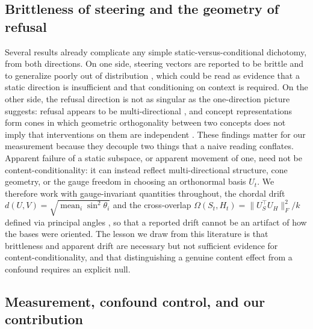 \subsection{Brittleness of steering and the geometry of refusal}

Several results already complicate any simple static-versus-conditional dichotomy, from both directions. On one side, steering vectors are reported to be brittle and to generalize poorly out of distribution \citep{tan2024steering}, which could be read as evidence that a static direction is insufficient and that conditioning on context is required. On the other side, the refusal direction is not as singular as the one-direction picture suggests: refusal appears to be multi-directional \citep{pan2025hidden}, and concept representations form cones in which geometric orthogonality between two concepts does not imply that interventions on them are independent \citep{wollschlager2025geometry}. These findings matter for our measurement because they decouple two things that a naive reading conflates. Apparent failure of a static subspace, or apparent movement of one, need not be content-conditionality: it can instead reflect multi-directional structure, cone geometry, or the gauge freedom in choosing an orthonormal basis $U_t$. We therefore work with gauge-invariant quantities throughout, the chordal drift $d(U,V) = \sqrt{\operatorname{mean}_i \sin^2 \theta_i}$ and the cross-overlap $\Omega(S_t,H_t) = \lVert U_S^\top U_H \rVert_F^2 / k$ defined via principal angles \citep{edelman1998geometry}, so that a reported drift cannot be an artifact of how the bases were oriented. The lesson we draw from this literature is that brittleness and apparent drift are necessary but not sufficient evidence for content-conditionality, and that distinguishing a genuine content effect from a confound requires an explicit null.

\subsection{Measurement, confound control, and our contribution}


